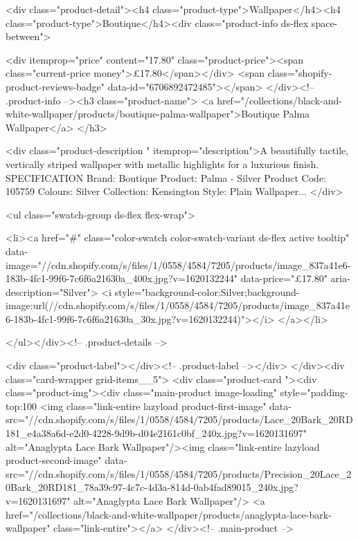{{{{{{{<div class="product-detail"><h4 class="product-type">Wallpaper</h4><h4 class="product-type">Boutique</h4><div class="product-info ds-flex space-between">
    
<div itemprop="price" content="17.80" class="product-price"><span class="current-price money">£17.80</span></div>
    <span class="shopify-product-reviews-badge" data-id="6706892472485"></span>
  </div><!-- .product-info --><h3 class="product-name">
      <a href="/collections/black-and-white-wallpaper/products/boutique-palma-wallpaper">Boutique Palma Wallpaper</a>
    </h3>
    
<div class="product-description " itemprop="description">A beautifully tactile, vertically striped wallpaper with metallic highlights for a luxurious finish. SPECIFICATION Brand: Boutique Product: Palma - Silver Product Code: 105759 Colours: Silver Collection: Kensington Style: Plain Wallpaper...
</div>



<ul class="swatch-group ds-flex flex-wrap">
        
<li><a href="#" class="color-swatch color-swatch-variant ds-flex active tooltip" data-image="//cdn.shopify.com/s/files/1/0558/4584/7205/products/image_837a41e6-183b-4fc1-99f6-7c6f6a21630a_400x.jpg?v=1620132244" data-price="£17.80" aria-description="Silver">
              <i style="background-color:Silver;background-image:url(//cdn.shopify.com/s/files/1/0558/4584/7205/products/image_837a41e6-183b-4fc1-99f6-7c6f6a21630a_30x.jpg?v=1620132244)"></i>
            </a></li>

      </ul></div><!-- .product-details -->

<div class="product-label"></div><!-- .product-label --></div>
          </div><div class="card-wrapper grid-items__5">
            <div class="product-card "><div class="product-img"><div class="main-product image-loading" style="padding-top:100%
      <img class="link-entire lazyload product-first-image" data-src="//cdn.shopify.com/s/files/1/0558/4584/7205/products/Lace_20Bark_20RD181_e4a38a6d-e2d0-4228-9d9b-d04e2161c0bf_240x.jpg?v=1620131697" alt="Anaglypta Lace Bark Wallpaper"/><img class="link-entire lazyload product-second-image" data-src="//cdn.shopify.com/s/files/1/0558/4584/7205/products/Precision_20Lace_20Bark_20RD181_78a39c97-4c7c-4d3a-814d-0ab4fad89015_240x.jpg?v=1620131697" alt="Anaglypta Lace Bark Wallpaper"/>
      <a href="/collections/black-and-white-wallpaper/products/anaglypta-lace-bark-wallpaper" class="link-entire"></a>
    </div><!-- .main-product -->
  
}}}}}}}
